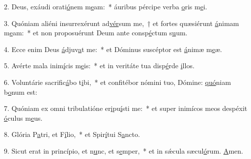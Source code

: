 2. Deus, exáudi orati\uline{ó}nem m\uline{e}am:~* áuribus pércipe verba \uline{o}ris m\uline{e}i.\par 
3. Quóniam aliéni insurrexérunt ad\uline{vér}sum me,~† et fortes quæsiérunt \uline{á}nimam m\uline{e}am:~* et non proposuérunt Deum ante consp\uline{é}ctum s\uline{u}um.\par 
4. Ecce enim Deus \uline{á}djuv\uline{a}t me:~* et Dóminus suscéptor est \uline{á}nimæ m\uline{e}æ.\par 
5. Avérte mala inim\uline{í}cis m\uline{e}is:~* et in veritáte tua disp\uline{é}rde \uline{i}llos.\par 
6. Voluntárie sacrific\uline{á}bo t\uline{i}bi,~* et confitébor nómini tuo, Dómine: \uline{quó}niam b\uline{o}num est:\par 
7. Quóniam ex omni tribulatióne er\uline{i}pu\uline{í}sti me:~* et super inimícos meos despéxit \uline{ó}culus m\uline{e}us.\par 
8. Glória P\uline{a}tri, et F\uline{í}lio,~* et Spir\uline{í}tui S\uline{a}ncto.\par 
9. Sicut erat in princípio, et n\uline{u}nc, et s\uline{e}mper,~* et in sǽcula sæcul\uline{ó}rum. \uline{A}men.\par 
